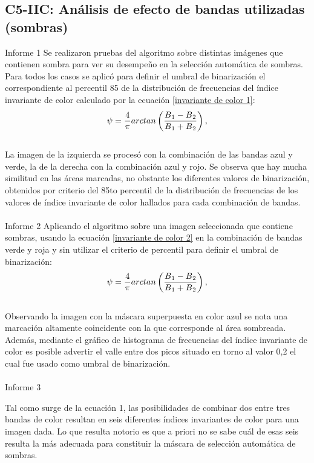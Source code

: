 \subsection{C5-IIC: Análisis de efecto de bandas utilizadas (sombras)}
Informe 1
Se realizaron pruebas del algoritmo sobre distintas imágenes que contienen sombra para ver su desempeño en la selección automática de sombras. Para todos los casos se aplicó para definir el umbral de binarización el correspondiente al percentil 85 de la distribución de frecuencias del índice invariante de color calculado por la ecuación \ref{invariante de color 1}:
\\
\begin{equation}
	\psi=\frac{4}{\pi} arctan\left(\frac{B\textsubscript{1}-B\textsubscript{2}}{B\textsubscript{1}+B\textsubscript{2}}\right),\label{invariante de color 1}
\end{equation}
\\
La imagen de la izquierda se procesó con la combinación de las bandas azul y verde, la de la derecha con la combinación azul y rojo.
Se observa que hay mucha similitud en las áreas marcadas, no obstante los diferentes valores de binarización, obtenidos por criterio del 85to percentil de la distribución de frecuencias de los valores de índice invariante de color hallados para cada combinación de bandas.
\\
\\
Informe 2
Aplicando el algoritmo sobre una imagen seleccionada que contiene sombras, usando la ecuación \ref{invariante de color 2} en la combinación de bandas verde y roja y sin utilizar el criterio de percentil para definir el umbral de binarización:
\\
\begin{equation}
	\psi=\frac{4}{\pi} arctan\left(\frac{B\textsubscript{1}-B\textsubscript{2}}{B\textsubscript{1}+B\textsubscript{2}}\right),\label{invariante de color2}
\end{equation}
\\
Observando la imagen con la máscara superpuesta en color azul se nota una marcación altamente coincidente con la que corresponde al área sombreada. Además, mediante el gráfico de histograma de frecuencias del índice invariante de color es posible advertir el valle entre dos picos situado en torno al valor 0,2 el cual fue usado como umbral de binarización.
\\
\\
Informe 3

Tal como surge de la ecuación 1, las posibilidades de combinar dos entre tres bandas de color resultan en seis diferentes índices invariantes de color para una imagen dada. Lo que resulta notorio es que a priori no se sabe cuál de esas seis resulta la más adecuada para constituir la máscara de selección automática de sombras. 
\color{black}
